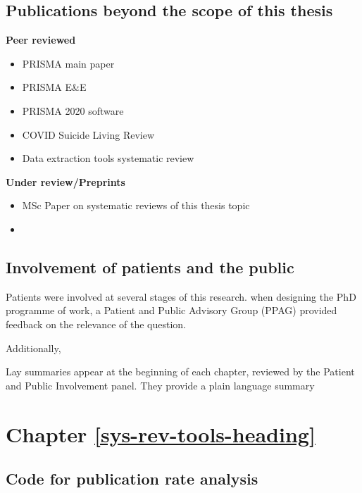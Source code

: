 \documentclass[a4paper, twoside]{templates/ociamthesis}
\begin{document}
\hypertarget{appendix-publications}{%
\subsection{Publications beyond the scope of this thesis}\label{appendix-publications}}

\textbf{Peer reviewed}

\begin{itemize}
\item
  PRISMA main paper
\item
  PRISMA E\&E
\item
  PRISMA 2020 software
\item
  COVID Suicide Living Review
\item
  Data extraction tools systematic review
\end{itemize}

\textbf{Under review/Preprints}

\begin{itemize}
\item
  MSc Paper on systematic reviews of this thesis topic
\item
\end{itemize}

\hypertarget{appendix-ppi}{%
\subsection{Involvement of patients and the public}\label{appendix-ppi}}

Patients were involved at several stages of this research. when designing the PhD programme of work, a Patient and Public Advisory Group (PPAG) provided feedback on the relevance of the question.

Additionally,

Lay summaries appear at the beginning of each chapter, reviewed by the Patient and Public Involvement panel. They provide a plain language summary

\hypertarget{appendix-sys-rev-tools}{%
\section{Chapter \ref{sys-rev-tools-heading}}\label{appendix-sys-rev-tools}}

\hypertarget{code-for-publication-rate-analysis}{%
\subsection{Code for publication rate analysis}\label{code-for-publication-rate-analysis}}
\end{document}
